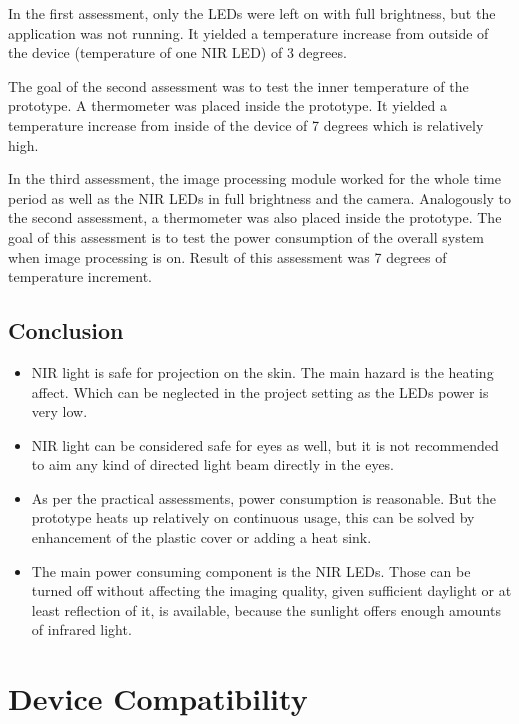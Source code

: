 In the first assessment, only the LEDs were left on with full brightness, but the application was not running. It yielded a temperature increase from outside of the device (temperature of one NIR LED) of 3 degrees.

The goal of the second assessment was to test the inner temperature of the prototype. A thermometer was placed inside the prototype. It yielded a temperature increase from inside of the device of 7 degrees which is relatively high.

In the third assessment, the image processing module worked for the whole time period as well as the NIR LEDs in full brightness and the camera. Analogously to the second assessment, a thermometer was also placed inside the prototype. The goal of this assessment is to test the power consumption of the overall system when image processing is on. Result of this assessment was 7 degrees of temperature increment.

\subsection{Conclusion }

\begin{itemize}

\item NIR light is safe for projection on the skin. The main hazard is the heating affect. Which can be neglected in the project setting as the LEDs power is very low. 
\item NIR light can be considered safe for eyes as well, but it is not recommended to aim any kind of directed light beam directly in the eyes.
\item As per the practical assessments, power consumption is reasonable. But the prototype heats up relatively on continuous usage, this can be solved by enhancement of the plastic cover or adding a heat sink.
\item The main power consuming component is the NIR LEDs. Those can be turned off without affecting the imaging quality, given sufficient daylight or at least reflection of it, is available, because the sunlight offers enough amounts of infrared light.

\end{itemize}


\section{Device Compatibility}

